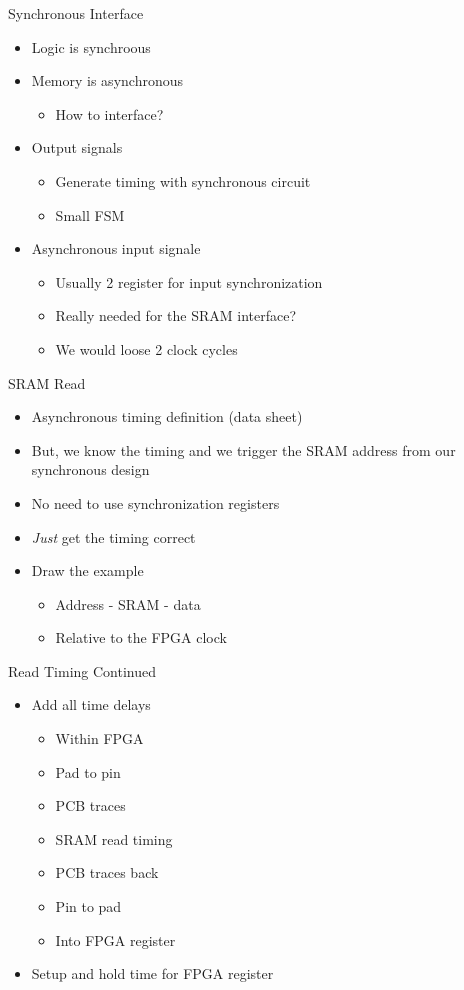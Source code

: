 \begin{frame}[fragile]{Synchronous Interface}
\begin{itemize}
\item Logic is synchroous
\item Memory is asynchronous
\begin{itemize}
\item How to interface?
\end{itemize}
\item Output signals
\begin{itemize}
\item Generate timing with synchronous circuit
\item Small FSM
\end{itemize}
\item Asynchronous input signale
\begin{itemize}
\item Usually 2 register for input synchronization
\item Really needed for the SRAM interface?
\item We would loose 2 clock cycles
\end{itemize}
\end{itemize}
\end{frame}


\begin{frame}[fragile]{SRAM Read}
\begin{itemize}
\item Asynchronous timing definition (data sheet)
\item But, we know the timing and we trigger the SRAM address from
our synchronous design
\item No need to use synchronization registers
\item \emph{Just} get the timing correct
\item Draw the example
\begin{itemize}
\item Address - SRAM - data
\item Relative to the FPGA clock
\end{itemize}
\end{itemize}
\end{frame}

\begin{frame}[fragile]{Read Timing Continued}
\begin{itemize}
\item Add all time delays
\begin{itemize}
\item Within FPGA
\item Pad to pin
\item PCB traces
\item SRAM read timing
\item PCB traces back
\item Pin to pad
\item Into FPGA register
\end{itemize}
\item Setup and hold time for FPGA register
\end{itemize}
\end{frame}

